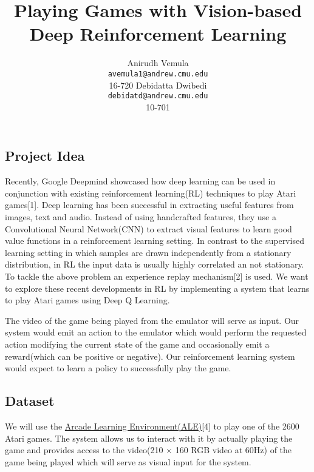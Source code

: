 \documentclass{article} %
\title{Playing Games with Vision-based Deep Reinforcement Learning}
\author{
Anirudh Vemula \\
\texttt{avemula1@andrew.cmu.edu} \\
16-720
\And
Debidatta Dwibedi\\
\texttt{debidatd@andrew.cmu.edu} \\
10-701
}
\begin{document}
\maketitle


\subsection*{Project Idea}
Recently, Google Deepmind showcased how deep learning can be used in conjunction with existing reinforcement learning(RL) techniques to play Atari games[1]. Deep learning has been successful in extracting useful features from images, text and audio. Instead of using handcrafted features, they use a Convolutional Neural Network(CNN) to extract visual features to learn good value functions in a reinforcement learning setting. In contrast to the supervised learning setting in which samples are drawn independently from a stationary distribution, in RL the input data is usually highly correlated an not stationary. To tackle the above problem  an experience replay mechanism[2] is used. We want to explore these recent developments in RL by implementing a system that learns to play Atari games using Deep Q Learning.

The video of the game being played from the emulator will serve as input. Our system would emit an action to the emulator which would perform the requested action modifying the current state of the game and occasionally emit a reward(which can be positive or negative). Our reinforcement learning system would expect to learn a policy to successfully play the game.

\subsection*{Dataset}

We will use the \href{http://www.arcadelearningenvironment.org/}{Arcade Learning Environment(ALE)}[4] to play one of the 2600 Atari games. The system allows us to interact with it by actually playing the game and provides access to the video(210 $\times$ 160 RGB video at 60Hz) of the game being played which will serve as visual input for the system. 
\end{document}
